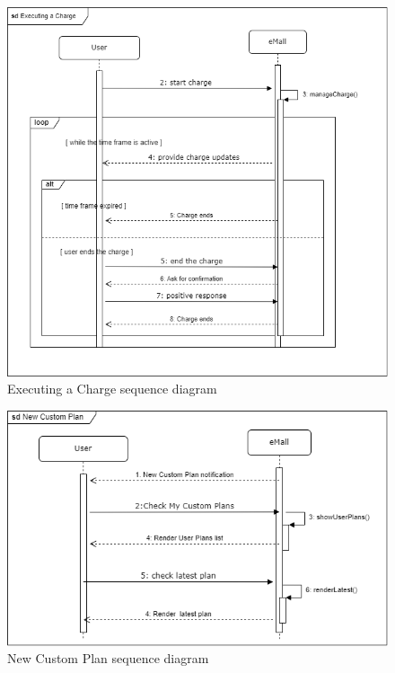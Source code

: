 \documentclass[12pt]{report}
\begin{document}
    \begin{figure}[h]
        \centering
        \includegraphics[width=\textwidth]{assets/manage charge.png}
        \caption{Executing a Charge sequence diagram}
    \end{figure}

        \begin{figure}[h]
        \centering
        \includegraphics[width=\textwidth]{assets/custom_charge.png}
        \caption{New Custom Plan sequence diagram}
    \end{figure}
\end{document}
